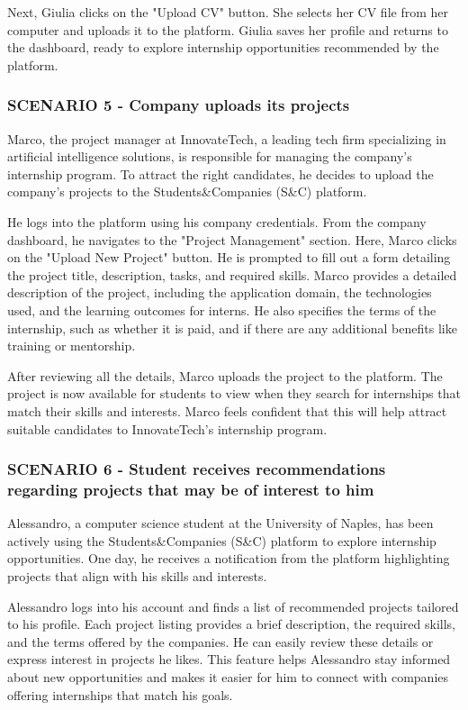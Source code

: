 Next, Giulia clicks on the "Upload CV" button. She selects her CV file from her computer
and uploads it to the platform. Giulia saves her profile and returns to the dashboard, ready to
explore internship opportunities recommended by the platform.
\subsubsection{SCENARIO 5 - Company uploads its projects}
Marco, the project manager at InnovateTech, a leading tech firm specializing in artificial intelligence
solutions, is responsible for managing the company’s internship program. To attract the right candidates,
he decides to upload the company’s projects to the Students\&Companies (S\&C) platform.  

He logs into the platform using his company credentials. From the company dashboard, he navigates to
the "Project Management" section. Here, Marco clicks on the "Upload New Project" button. He is prompted
to fill out a form detailing the project title, description, tasks, and required skills. Marco provides
a detailed description of the project, including the application domain, the technologies used, and the
learning outcomes for interns. He also specifies the terms of the internship, such as whether it is paid,
and if there are any additional benefits like training or mentorship.  

After reviewing all the details, Marco uploads the project to the platform. The project is now available
for students to view when they search for internships that match their skills and interests. Marco feels
confident that this will help attract suitable candidates to InnovateTech’s internship program.
\subsubsection{SCENARIO 6 - Student receives recommendations regarding projects that may be of interest to him}
Alessandro, a computer science student at the University of Naples, has been actively using the
Students\&Companies (S\&C) platform to explore internship opportunities. One day, he receives a
notification from the platform highlighting projects that align with his skills and interests.

Alessandro logs into his account and finds a list of recommended projects tailored to his profile.
Each project listing provides a brief description, the required skills, and the terms offered by
the companies. He can easily review these details or express interest in projects he likes.
This feature helps Alessandro stay informed about new opportunities and makes it easier for
him to connect with companies offering internships that match his goals.

